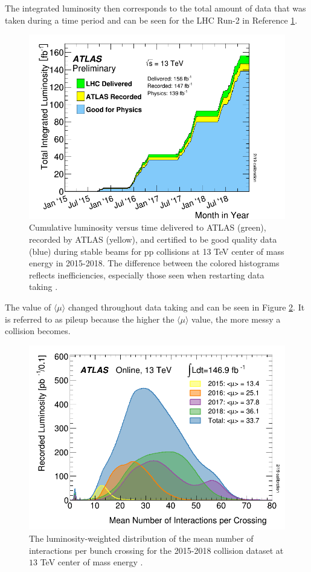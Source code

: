 		The integrated luminosity then corresponds to the total amount of data that was taken during a time period and can be seen for the LHC Run-2 in Reference \ref{fig:lhc-lumi}.
		\begin{figure}[!ht]
		\centering
		\includegraphics[width=.65\textwidth,keepaspectratio=true]{chapters/chapter3_experiment/images/intlumivstimeRun2DQall.png}
		\caption{ Cumulative luminosity versus time delivered to \gls{ATLAS} (green), recorded by \gls{ATLAS} (yellow), and certified to be good quality data (blue) during stable beams for pp collisions at 13 TeV center of mass energy in 2015-2018. The difference between the colored histograms reflects inefficiencies, especially those seen when restarting data taking \cite{luminositypublicresultsrun2}.}
		\label{fig:lhc-lumi}
		\end{figure}
		The value of $\langle \mu \rangle$ changed throughout data taking and can be seen in Figure \ref{fig:run2-mu}. It is referred to as pileup because the higher the $\langle \mu \rangle$ value, the more messy a collision becomes.
		\begin{figure}[!ht]
		\centering
		\includegraphics[width=.65\textwidth,keepaspectratio=true]{chapters/chapter3_experiment/images/mu_2015_2018.png}
		\caption{ The luminosity-weighted distribution of the mean number of interactions per bunch crossing for the 2015-2018 \pp collision dataset at $13$ TeV center of mass energy \cite{luminositypublicresultsrun2}.}
		\label{fig:run2-mu}
		\end{figure}
